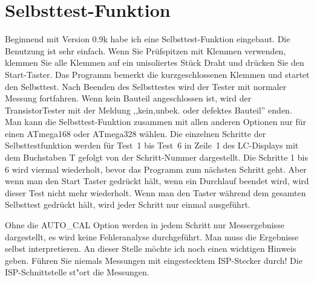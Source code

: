
\section{Selbsttest-Funktion}
\label{sec:selftest}
Beginnend mit Version 0.9k habe ich eine Selbsttest-Funktion eingebaut.
Die Benutzung ist sehr einfach.
Wenn Sie Pr\"ufspitzen mit Klemmen verwenden, klemmen Sie alle Klemmen auf ein unisoliertes St\"uck Draht und dr\"ucken Sie
den Start-Taster.
Das Programm bemerkt die kurzgeschlossenen Klemmen und startet den Selbsttest.
Nach Beenden des Selbsttestes wird der Tester mit normaler Messung fortfahren.
Wenn kein Bauteil angeschlossen ist, wird der TransistorTester mit der
Meldung ,,kein,unbek. oder defektes Bauteil'' enden.
Man kann die Selbsttest-Funktion zusammen mit allen anderen Optionen nur f\"ur einen ATmega168
oder ATmega328 w\"ahlen.
Die einzelnen Schritte der Selbsttestfunktion werden f\"ur Test~1 bis Test~6 in Zeile~1 des LC-Displays mit dem Buchstaben T
gefolgt von der Schritt-Nummer dargestellt.
Die Schritte 1 bis 6 wird viermal wiederholt, bevor das Programm zum n\"achsten Schritt geht.
Aber wenn man den Start Taster gedr\"uckt h\"alt, wenn ein Durchlauf beendet wird, wird dieser Test nicht
mehr wiederholt.
Wenn man den Taster w\"ahrend dem gesamten Selbsttest gedr\"uckt h\"alt, wird jeder Schritt nur einmal ausgef\"uhrt.

Ohne die AUTO\_CAL Option werden in jedem Schritt nur Messergebnisse dargestellt, es wird keine Fehleranalyse durchgef\"uhrt.
Man  muss die Ergebnisse selbst interpretieren.
An dieser Stelle m\"ochte ich noch einen wichtigen Hinweis geben. F\"uhren Sie niemals Messungen mit
eingestecktem ISP-Stecker durch!
Die ISP-Schnittstelle st"ort die Messungen.

